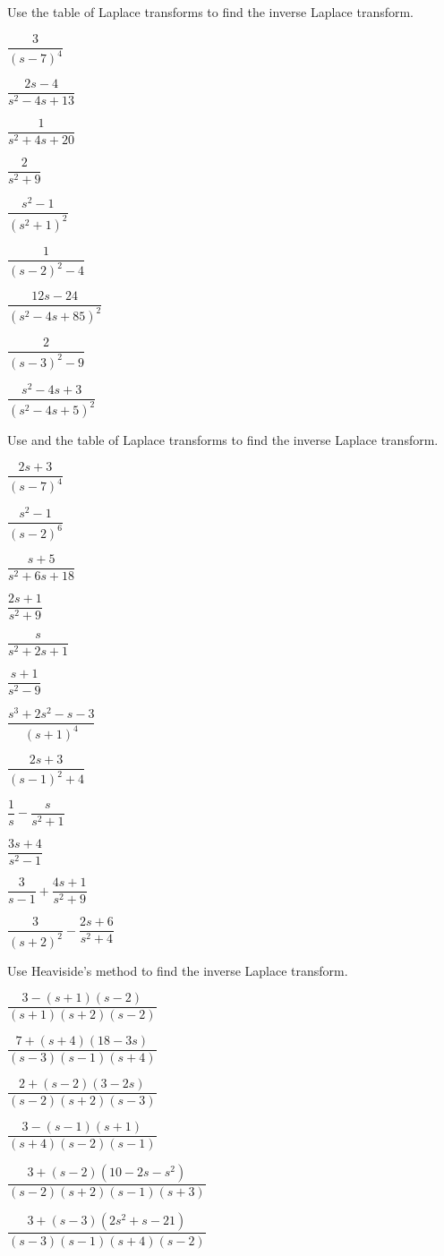 \begin{exerciselist}
\item\label{exer:8.2.1}Use the table of Laplace transforms  to find the inverse Laplace
transform.

\begin{alist*}[columns=3]
\item $\dfrac{3}{(s-7)^4}$
\item $\dfrac{2s-4}{s^2-4s+13}$
\item $\dfrac{1}{s^2+4s+20}$
\item $\dfrac{2}{s^2+9}$
\item $\dfrac{s^2-1}{(s^2+1)^2}$
\item $\dfrac{1}{(s-2)^2-4}$
\item $\dfrac{12s-24}{(s^2-4s+85)^2}$
\item $\dfrac{2}{(s-3)^2-9}$
\item $\dfrac{s^2-4s+3}{(s^2-4s+5)^2}$
\end{alist*}

\item\label{exer:8.2.2}Use  and the table of Laplace transforms
  to find the inverse Laplace transform.

\begin{alist*}[columns=3]
\item $\dfrac{2s+3}{(s-7)^4}$
\item $\dfrac{s^2-1}{(s-2)^6}$
\item $\dfrac{s+5}{s^2+6s+18}$
\item $\dfrac{2s+1}{s^2+9}$
\item $\dfrac{s}{s^2+2s+1}$
\item $\dfrac{s+1}{s^2-9}$
\item $\dfrac{s^3+2s^2-s-3}{(s+1)^4}$
\item $\dfrac{2s+3}{(s-1)^2+4}$
\item $\dfrac{1}{s}-\dfrac{s}{s^2+1}$
\item $\dfrac{3s+4}{s^2-1}$
\item $\dfrac{3}{s-1}+\dfrac{4s+1}{s^2+9}$
\item $\dfrac{3}{(s+2)^2}-\dfrac{2s+6}{s^2+4}$
\end{alist*}

\item\label{exer:8.2.3}Use Heaviside's method to find the inverse Laplace transform.

\begin{alist*}[columns=2]
\item $\dfrac{3-(s+1)(s-2)}{(s+1)(s+2)(s-2)}$
\item $\dfrac{7+(s+4)(18-3s)}{(s-3)(s-1)(s+4)}$
\item $\dfrac{2+(s-2)(3-2s)}{(s-2)(s+2)(s-3)}$
\item $\dfrac{3-(s-1)(s+1)}{(s+4)(s-2)(s-1)}$
\item $\dfrac{3+(s-2)(10-2s-s^2)}{(s-2)(s+2)(s-1)(s+3)}$
\item $\dfrac{3+(s-3)(2s^2+s-21)}{(s-3)(s-1)(s+4)(s-2)}$
\end{alist*}


\end{exerciselist}
